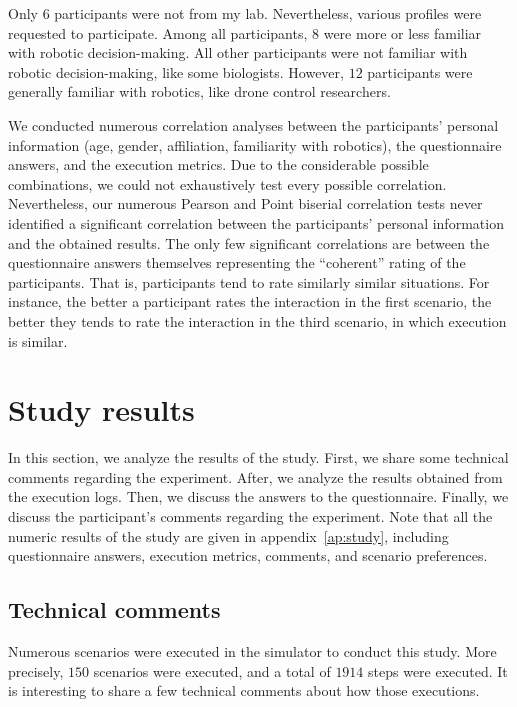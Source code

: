 Only $6$ participants were not from my lab. Nevertheless, various profiles were requested to participate. Among all participants, $8$ were more or less familiar with robotic decision-making. All other participants were not familiar with robotic decision-making, like some biologists. However, $12$ participants were generally familiar with robotics, like drone control researchers.  

We conducted numerous correlation analyses between the participants' personal information (age, gender, affiliation, familiarity with robotics), the questionnaire answers, and the execution metrics. Due to the considerable possible combinations, we could not exhaustively test every possible correlation. Nevertheless, our numerous Pearson and Point biserial correlation tests never identified a significant correlation between the participants' personal information and the obtained results. The only few significant correlations are between the questionnaire answers themselves representing the ``coherent'' rating of the participants. That is, participants tend to rate similarly similar situations. For instance, the better a participant rates the interaction in the first scenario, the better they tends to rate the interaction in the third scenario, in which execution is similar.


\section{Study results}

In this section, we analyze the results of the study. First, we share some technical comments regarding the experiment. After, we analyze the results obtained from the execution logs. Then, we discuss the answers to the questionnaire. Finally, we discuss the participant's comments regarding the experiment. Note that all the numeric results of the study are given in appendix~\ref{ap:study}, including questionnaire answers, execution metrics, comments, and scenario preferences. 

\subsection{Technical comments}

Numerous scenarios were executed in the simulator to conduct this study. More precisely, $150$ scenarios were executed, and a total of $1914$ steps were executed. It is interesting to share a few technical comments about how those executions.


